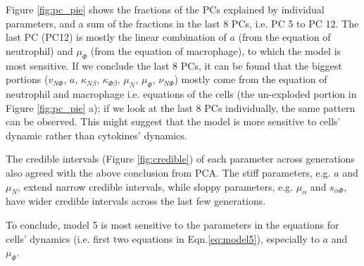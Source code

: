 Figure \ref{fig:pc_pie} shows the fractions of the PCs explained by individual parameters, and a sum of the fractions in the last 8 PCs, i.e. PC 5 to PC 12. The last PC (PC12) is mostly the linear combination of $a$ (from the equation of neutrophil) and $\mu_\Phi$ (from the equation of macrophage), to which the model is most sensitive. If we conclude the last 8 PCs, it can be found that the biggest portions ($v_{N\Phi}$, $a$, $\kappa_{N\beta}$, $\kappa_{\Phi\beta}$, $\mu_N$, $\mu_\Phi$, $\nu_{N\Phi}$) mostly come from the equation of neutrophil and macrophage i.e. equations of the cells (the un-exploded portion in Figure \ref{fig:pc_pie} a); if we look at the last 8 PCs individually, the same pattern can be observed. This might suggest that the model is more sensitive to cells' dynamic rather than cytokines' dynamics.

The credible intervals (Figure \ref{fig:credible}) of each parameter across generations also agreed with the above conclusion from PCA. The stiff parameters, e.g. $a$ and $\mu_N$, extend narrow credible intervals, while sloppy parameters, e.g. $\mu_\alpha$ and $s_{\alpha\Phi}$, have wider credible intervals across the last few generations.

To conclude, model 5 is most sensitive to the parameters in the equations for cells' dynamics (i.e. first two equations in Eqn.\ref{eq:model5}), especially to $a$ and $\mu_\Phi$.


